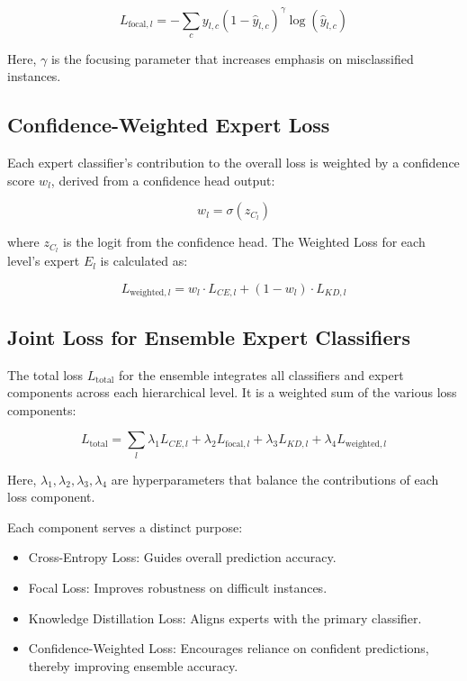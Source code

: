 \documentclass[9pt,a4paper,twoside]{rho-class/rho}
\begin{document}
   \[
   L_{\text{focal},l} = -\sum_{c} y_{l,c} (1 - \hat{y}_{l,c})^\gamma \log(\hat{y}_{l,c})
   \]

   Here, \( \gamma \) is the focusing parameter that increases emphasis on misclassified instances.

 \subsection{Confidence-Weighted Expert Loss}
    
         Each expert classifier’s contribution to the overall loss is weighted by a confidence score \( w_l \), derived from a confidence head output:

   \[
   w_l = \sigma(z_{C_l})
   \]

   where \( z_{C_l} \) is the logit from the confidence head. The Weighted Loss for each level’s expert \( E_l \) is calculated as:

   \[
   L_{\text{weighted},l} = w_l \cdot L_{CE,l} + (1 - w_l) \cdot L_{KD,l}
   \]
 \subsection{Joint Loss for Ensemble Expert Classifiers}
    
        The total loss \( L_{\text{total}} \) for the ensemble integrates all classifiers and expert components across each hierarchical level. It is a weighted sum of the various loss components:

   \[
   L_{\text{total}} = \sum_{l} \lambda_1 L_{CE,l} + \lambda_2 L_{\text{focal},l} + \lambda_3 L_{KD,l} + \lambda_4 L_{\text{weighted},l}
   \]

   Here, \( \lambda_1, \lambda_2, \lambda_3, \lambda_4 \) are hyperparameters that balance the contributions of each loss component.

Each component serves a distinct purpose:
\begin{itemize}
    \item Cross-Entropy Loss: Guides overall prediction accuracy.
    \item Focal Loss: Improves robustness on difficult instances.
    \item Knowledge Distillation Loss: Aligns experts with the primary classifier.
    \item Confidence-Weighted Loss: Encourages reliance on confident predictions, thereby improving ensemble accuracy.
\end{itemize}
\end{document}
